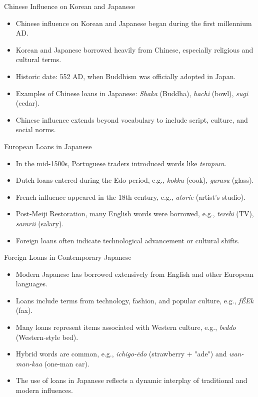 \documentclass{beamer}
\begin{document}
\begin{frame}{Chinese Influence on Korean and Japanese}
    \begin{itemize}
        \item Chinese influence on Korean and Japanese began during the first millennium AD.
        \item Korean and Japanese borrowed heavily from Chinese, especially religious and cultural terms.
        \item Historic date: 552 AD, when Buddhism was officially adopted in Japan.
        \item Examples of Chinese loans in Japanese: \textit{Shaka} (Buddha), \textit{hachi} (bowl), \textit{sugi} (cedar).
        \item Chinese influence extends beyond vocabulary to include script, culture, and social norms.
    \end{itemize}
\end{frame}

\begin{frame}{European Loans in Japanese}
    \begin{itemize}
        \item In the mid-1500s, Portuguese traders introduced words like \textit{tempura}.
        \item Dutch loans entered during the Edo period, e.g., \textit{kokku} (cook), \textit{garasu} (glass).
        \item French influence appeared in the 18th century, e.g., \textit{atorie} (artist's studio).
        \item Post-Meiji Restoration, many English words were borrowed, e.g., \textit{terebi} (TV), \textit{sararii} (salary).
        \item Foreign loans often indicate technological advancement or cultural shifts.
    \end{itemize}
\end{frame}

\begin{frame}{Foreign Loans in Contemporary Japanese}
    \begin{itemize}
        \item Modern Japanese has borrowed extensively from English and other European languages.
        \item Loans include terms from technology, fashion, and popular culture, e.g., \textit{fÉEk} (fax).
        \item Many loans represent items associated with Western culture, e.g., \textit{beddo} (Western-style bed).
        \item Hybrid words are common, e.g., \textit{ichigo-ēdo} (strawberry + "ade") and \textit{wan-man-kaa} (one-man car).
        \item The use of loans in Japanese reflects a dynamic interplay of traditional and modern influences.
    \end{itemize}
\end{frame}
\end{document}
